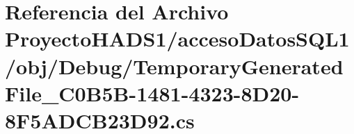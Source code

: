 \hypertarget{_proyecto_h_a_d_s1_2acceso_datos_s_q_l1_2obj_2_debug_2_temporary_generated_file__036_c0_b5_b-148ee1baed958fae296713a4e4bd96c9948}{}\section{Referencia del Archivo Proyecto\+H\+A\+D\+S1/acceso\+Datos\+S\+Q\+L1/obj/\+Debug/\+Temporary\+Generated\+File\+\_\+C0\+B5\+B-\/1481-\/4323-\/8\+D20-\/8\+F5\+A\+D\+C\+B23\+D92.cs}
\label{_proyecto_h_a_d_s1_2acceso_datos_s_q_l1_2obj_2_debug_2_temporary_generated_file__036_c0_b5_b-148ee1baed958fae296713a4e4bd96c9948}
